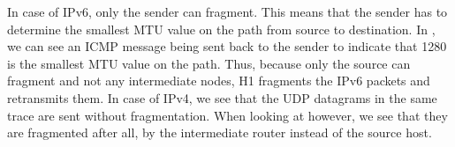 In case of IPv6, only the sender can fragment. This means that the sender has to determine the smallest MTU value on the path from source to destination. In , we can see an ICMP message being sent back to the sender to indicate that 1280 is the smallest MTU value on the path. Thus, because only the source can fragment and not any intermediate nodes, H1 fragments the IPv6 packets and retransmits them. In case of IPv4, we see that the UDP datagrams in the same trace are sent without fragmentation. When looking at  however, we see that they are fragmented after all, by the intermediate router instead of the source host.